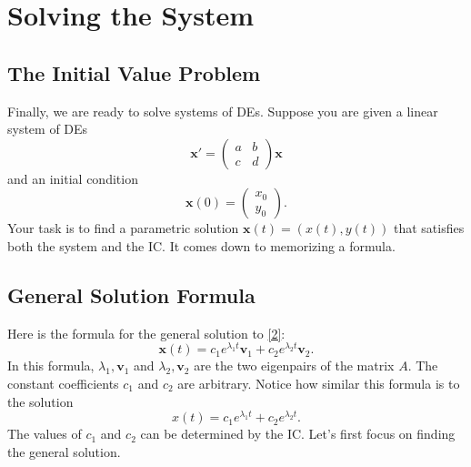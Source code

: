 \documentclass[10pt,letterpaper]{article}
\begin{document}
\section{Solving the System}

\subsection{The Initial Value Problem}

Finally, we are ready to solve systems of DEs. Suppose you are given a linear system of DEs
\begin{equation} \label{2}    
\textbf{x}' = \begin{pmatrix}
    a & b\\
    c & d
\end{pmatrix} \textbf{x}
\end{equation}
and an initial condition 
$$
\textbf{x}(0) = \begin{pmatrix}
    x_0\\y_0
\end{pmatrix}. 
$$
Your task is to find a parametric solution $\textbf{x}(t)=(x(t),y(t))$ that satisfies both the system and the IC. It comes down to memorizing a formula.

\subsection{General Solution Formula}

Here is the formula for the general solution to \eqref{2}:
\[
\boxed{
\mathbf{x}(t)
=c_1e^{\lambda_1t}\mathbf{v}_1
+c_2e^{\lambda_2t}\mathbf{v}_2.
}
\]
In this formula, $\lambda_1, \textbf{v}_1$ and $\lambda_2, \textbf{v}_2$ are the two eigenpairs of the matrix $A$. The constant coefficients $c_1$ and $c_2$ are arbitrary. Notice how similar this formula is to the solution
$$
    x(t) = c_1 e^{\lambda_1 t}+c_2 e^{\lambda_2 t}.
$$
The values of $c_1$ and $c_2$ can be determined by the IC.  Let's first focus on finding the general solution.
\end{document}
